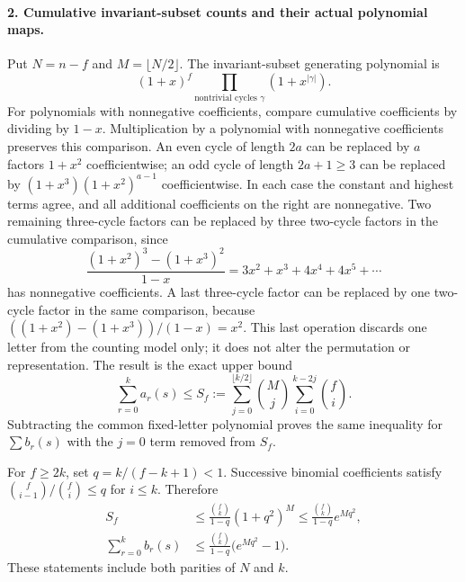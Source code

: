 \paragraph{2. Cumulative invariant-subset counts and their actual polynomial maps.}
Put $N=n-f$ and $M=\lfloor N/2\rfloor$. The invariant-subset
generating polynomial is
\[
             (1+x)^f\prod_{\text{nontrivial cycles }\gamma}
                                     (1+x^{|\gamma|}).
\]
For polynomials with nonnegative coefficients, compare
cumulative coefficients by dividing by $1-x$.
Multiplication by a polynomial with nonnegative coefficients
preserves this comparison.
An even cycle of length $2a$ can be replaced by $a$ factors
$1+x^2$ coefficientwise; an odd cycle of length $2a+1\ge3$
can be replaced by $(1+x^3)(1+x^2)^{a-1}$ coefficientwise.
In each case the constant and highest terms agree, and
all additional coefficients on the right are nonnegative.
Two remaining three-cycle factors can be replaced by three
two-cycle factors in the cumulative comparison, since
\[
 \frac{(1+x^2)^3-(1+x^3)^2}{1-x}
      =3x^2+x^3+4x^4+4x^5+\cdots
\]
has nonnegative coefficients. A last three-cycle factor can
be replaced by one two-cycle factor in the same comparison,
because $((1+x^2)-(1+x^3))/(1-x)=x^2$.
This last operation discards one letter from the counting
model only; it does not alter the permutation or representation.
The result is the exact upper bound
\[
 \sum_{r=0}^k a_r(s)\le S_f:=
       \sum_{j=0}^{\lfloor k/2\rfloor}
          \binom Mj\sum_{i=0}^{k-2j}\binom fi.
 \tag{F1T29.11}
\]
Subtracting the common fixed-letter polynomial proves the
same inequality for $\sum b_r(s)$ with the $j=0$ term
removed from $S_f$.

For $f\ge2k$, set $q=k/(f-k+1)<1$. Successive binomial
coefficients satisfy
$\binom f{i-1}/\binom fi\le q$ for $i\le k$. Therefore
\[
 \begin{split}
 S_f&\le\frac{\binom fk}{1-q}(1+q^2)^M
              \le\frac{\binom fk}{1-q}e^{Mq^2},\\
 \sum_{r=0}^k b_r(s)
       &\le\frac{\binom fk}{1-q}\bigl(e^{Mq^2}-1\bigr).
 \end{split}
 \tag{F1T29.12}
\]
These statements include both parities of $N$ and $k$.

